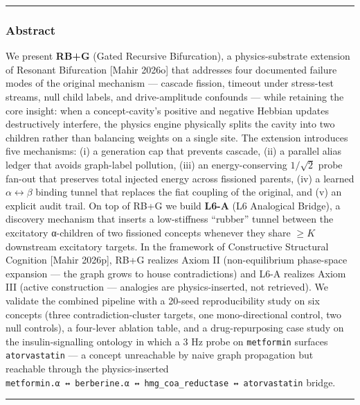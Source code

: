 \documentclass[
  11pt,
  a4paper,
]{article}
\begin{document}
\begin{center}\rule{0.5\linewidth}{0.5pt}\end{center}

\subsubsection{Abstract}\label{abstract-1}

We present \textbf{RB+G} (Gated Recursive Bifurcation), a
physics-substrate extension of Resonant Bifurcation {[}Mahir 2026o{]}
that addresses four documented failure modes of the original mechanism
--- cascade fission, timeout under stress-test streams, null child
labels, and drive-amplitude confounds --- while retaining the core
insight: when a concept-cavity's positive and negative Hebbian updates
destructively interfere, the physics engine physically splits the cavity
into two children rather than balancing weights on a single site. The
extension introduces five mechanisms: (i) a generation cap that prevents
cascade, (ii) a parallel alias ledger that avoids graph-label pollution,
(iii) an energy-conserving \(1/\sqrt{2}\) probe fan-out that preserves
total injected energy across fissioned parents, (iv) a learned
\(\alpha \leftrightarrow \beta\) binding tunnel that replaces the fiat
coupling of the original, and (v) an explicit audit trail. On top of
RB+G we build \textbf{L6-A} (L6 Analogical Bridge), a discovery
mechanism that inserts a low-stiffness ``rubber'' tunnel between the
excitatory α-children of two fissioned concepts whenever they share
\(\geq K\) downstream excitatory targets. In the framework of
Constructive Structural Cognition {[}Mahir 2026p{]}, RB+G realizes Axiom
II (non-equilibrium phase-space expansion --- the graph grows to house
contradictions) and L6-A realizes Axiom III (active construction ---
analogies are physics-inserted, not retrieved). We validate the combined
pipeline with a 20-seed reproducibility study on six concepts (three
contradiction-cluster targets, one mono-directional control, two null
controls), a four-lever ablation table, and a drug-repurposing case
study on the insulin-signalling ontology in which a 3 Hz probe on
\texttt{metformin} surfaces \texttt{atorvastatin} --- a concept
unreachable by naive graph propagation but reachable through the
physics-inserted
\texttt{metformin.α\ ↔\ berberine.α\ ↔\ hmg\_coa\_reductase\ ↔\ atorvastatin}
bridge.

\begin{center}\rule{0.5\linewidth}{0.5pt}\end{center}
\end{document}
